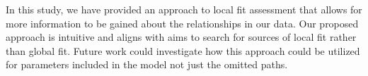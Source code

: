 \documentclass[noextraspace, floatsintext, 12pt]{apa7}
\begin{document}
In this study, we have provided an approach to local fit assessment that allows for more information to be gained about the relationships in our data.
Our proposed approach is intuitive and aligns with aims to search for sources of local fit rather than global fit.
Future work could investigate how this approach could be utilized for parameters included in the model not just the omitted paths.

\newpage
\raggedright
% 
%
\printbibliography
%
%
\end{document}
